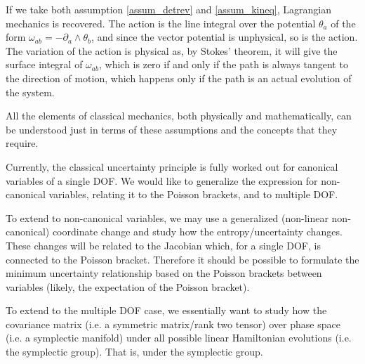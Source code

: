 If we take both assumption \ref{assum_detrev} and \ref{assum_kineq}, Lagrangian mechanics is recovered. The action is the line integral over the potential $\theta_a$ of the form $\omega_{ab} = - \partial_a \wedge \theta_b$, and since the vector potential is unphysical, so is the action. The variation of the action is physical as, by Stokes' theorem, it will give the surface integral of $\omega_{ab}$, which is zero if and only if the path is always tangent to the direction of motion, which happens only if the path is an actual evolution of the system.

All the elements of classical mechanics, both physically and mathematically, can be understood just in terms of these assumptions and the concepts that they require.



\ifdraft

\openproblembreak

{Currently, the classical uncertainty principle is fully worked out for canonical variables of a single DOF. We would like to generalize the expression for non-canonical variables, relating it to the Poisson brackets, and to multiple DOF.}

To extend to non-canonical variables, we may use a generalized (non-linear non-canonical) coordinate change and study how the entropy/uncertainty changes. These changes will be related to the Jacobian which, for a single DOF, is connected to the Poisson bracket. Therefore it should be possible to formulate the minimum uncertainty relationship based on the Poisson brackets between variables (likely, the expectation of the Poisson bracket).

To extend to the multiple DOF case, we essentially want to study how the covariance matrix (i.e. a symmetric matrix/rank two tensor) over phase space (i.e. a symplectic manifold) under all possible linear Hamiltonian evolutions (i.e. the symplectic group). That is, under the symplectic group.


